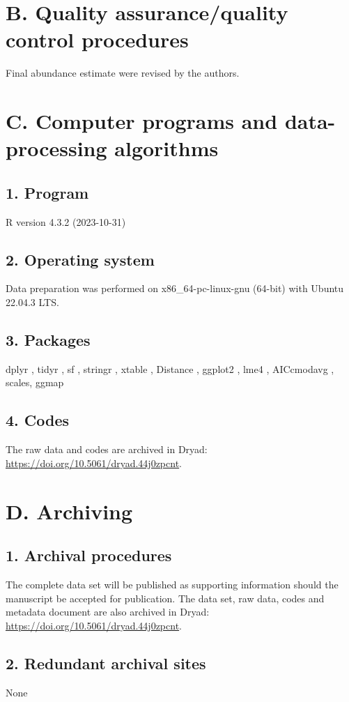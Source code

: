 \documentclass[a4paper,twoside,12pt]{article}
\begin{document}
    \section*{B. Quality assurance/quality control procedures}
    Final abundance estimate were revised by the authors.

    \section*{C. Computer programs and data-processing algorithms}
         \subsection*{1. Program} R version 4.3.2 (2023-10-31)
         \subsection*{2. Operating system} Data preparation was performed on x86\_64-pc-linux-gnu (64-bit) with Ubuntu 22.04.3 LTS.
         \subsection*{3. Packages} dplyr \citep{dplyr}, tidyr \citep{tidyr}, sf \citep{sf}, stringr \citep{stringr}, xtable \citep{xtable}, Distance \citep{miller2019}, ggplot2 \citep{ggplot2}, lme4 \citep{lme4}, AICcmodavg \citep{AICcmodavg}, scales\citep{scales}, ggmap \citep{ggmap}
         \subsection*{4. Codes} The raw data and codes are archived in Dryad: \url{https://doi.org/10.5061/dryad.44j0zpcnt}.
                
    \section*{D. Archiving}
         \subsection*{1. Archival procedures} The complete data set will be published as supporting information should the manuscript be accepted for publication. The data set, raw data, codes and metadata document are also archived in Dryad: \url{https://doi.org/10.5061/dryad.44j0zpcnt}.
         \subsection*{2. Redundant archival sites} None
            
\end{document}
